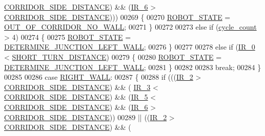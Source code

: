 \begin{DoxyCode}
      \hyperlink{state__machine_8c_a201d56046ddf552d57b4862e0ec07a10}{CORRIDOR\_SIDE\_DISTANCE}) && (\hyperlink{state__machine_8c_a8c51bcd8b555e8c78fea79b88d28b55e}{IR\_6} > 
      \hyperlink{state__machine_8c_a201d56046ddf552d57b4862e0ec07a10}{CORRIDOR\_SIDE\_DISTANCE})))
00269             \{
00270                 \hyperlink{state__machine_8h_a5e5321a4a9085b83c8161454bf7a145c}{ROBOT\_STATE} = \hyperlink{state__machine_8h_a94b1da2e055fff4d143aa6aa891f79a9a24fb9d9ff0b7ac346a2527509a251125}{OUT\_OF\_CORRIDOR\_NO\_WALL};
00271             \}
00272             
00273             \textcolor{keywordflow}{else} \textcolor{keywordflow}{if} (\hyperlink{state__machine_8c_a937f74a65988b9e22241ab3765b82c50}{cycle\_count} > 4)
00274             \{
00275                 \hyperlink{state__machine_8h_a5e5321a4a9085b83c8161454bf7a145c}{ROBOT\_STATE} = \hyperlink{state__machine_8h_a94b1da2e055fff4d143aa6aa891f79a9a2497397fadf5bd52daeb9da4db429e77}{DETERMINE\_JUNCTION\_LEFT\_WALL};
00276             \}
00277             
00278             \textcolor{keywordflow}{else} \textcolor{keywordflow}{if} (\hyperlink{state__machine_8c_a7afcf874a71b2cde367dc9c28f5f01f1}{IR\_0} < \hyperlink{state__machine_8c_adf843098ef425aa129f5ff16d879f7f2}{SHORT\_TURN\_DISTANCE})
00279             \{
00280                 \hyperlink{state__machine_8h_a5e5321a4a9085b83c8161454bf7a145c}{ROBOT\_STATE} = \hyperlink{state__machine_8h_a94b1da2e055fff4d143aa6aa891f79a9a2497397fadf5bd52daeb9da4db429e77}{DETERMINE\_JUNCTION\_LEFT\_WALL};
00281             \}
00282             
00283             \textcolor{keywordflow}{break};
00284         \}
00285         
00286         \textcolor{keywordflow}{case} \hyperlink{state__machine_8h_a94b1da2e055fff4d143aa6aa891f79a9a47412afab845bb5d82848c742c5aa826}{RIGHT\_WALL}:
00287         \{
00288             \textcolor{keywordflow}{if} (((\hyperlink{state__machine_8c_a07cfb2e201909d017a88a2a86c32cd4b}{IR\_2} > \hyperlink{state__machine_8c_a201d56046ddf552d57b4862e0ec07a10}{CORRIDOR\_SIDE\_DISTANCE}) && (
      \hyperlink{state__machine_8c_a7831b71dc250258ecefe0e23f9920688}{IR\_3} < \hyperlink{state__machine_8c_a201d56046ddf552d57b4862e0ec07a10}{CORRIDOR\_SIDE\_DISTANCE}) && (\hyperlink{state__machine_8c_ad00ba6cc1cf461bda7059f5aafc06142}{IR\_5} < 
      \hyperlink{state__machine_8c_a201d56046ddf552d57b4862e0ec07a10}{CORRIDOR\_SIDE\_DISTANCE}) && (\hyperlink{state__machine_8c_a8c51bcd8b555e8c78fea79b88d28b55e}{IR\_6} > 
      \hyperlink{state__machine_8c_a201d56046ddf552d57b4862e0ec07a10}{CORRIDOR\_SIDE\_DISTANCE}))
00289              || ((\hyperlink{state__machine_8c_a07cfb2e201909d017a88a2a86c32cd4b}{IR\_2} > \hyperlink{state__machine_8c_a201d56046ddf552d57b4862e0ec07a10}{CORRIDOR\_SIDE\_DISTANCE}) && (

\end{DoxyCode}
